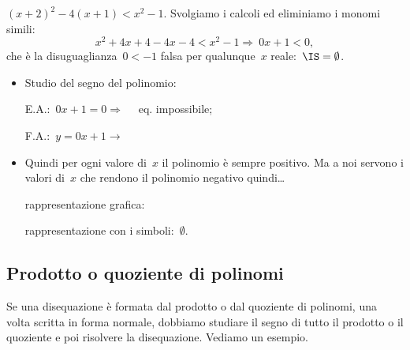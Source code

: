 \begin{esempio}
$(x+2)^2-4(x+1)<x^{2}-1.$
Svolgiamo i calcoli ed eliminiamo i monomi simili:
\[x^{2}+4x+4-4x-4<x^{2}-1\Rightarrow~0 x + 1 < 0,\]
che è la disuguaglianza~$0<-1$ falsa per qualunque~$x$ reale:~$\IS=\emptyset $.
\begin{itemize} [noitemsep]
 \item Studio del segno del polinomio:\\
 \begin{minipage}{.45\textwidth}
  E.A.:~$0 x + 1 = 0  \Rightarrow \quad $ eq. impossibile;
 \end{minipage}
 \begin{minipage}{.25\textwidth}
  F.A.:~$y=0 x + 1 \rightarrow $
 \end{minipage}
 \begin{minipage}{.3\textwidth}
  
 \end{minipage}
 \item Quindi per ogni valore di~$x$ il polinomio è sempre positivo.
  Ma a noi servono i valori di~$x$ che rendono il polinomio negativo
  quindi\dots
 \subitem
  \begin{minipage}{.35\textwidth}
   rappresentazione grafica:
  \end{minipage}
  \begin{minipage}{.30\textwidth}
   
  \end{minipage}
 \subitem rappresentazione con i simboli:~$\emptyset$.
\end{itemize}
\end{esempio}

\subsection{Prodotto o quoziente di polinomi}
\label{sec:dis_prod_quo}

Se una disequazione è formata dal prodotto o dal quoziente di polinomi,
una volta scritta in forma normale,
dobbiamo studiare il segno di tutto il prodotto o il quoziente e poi risolvere
la disequazione.
Vediamo un esempio.


